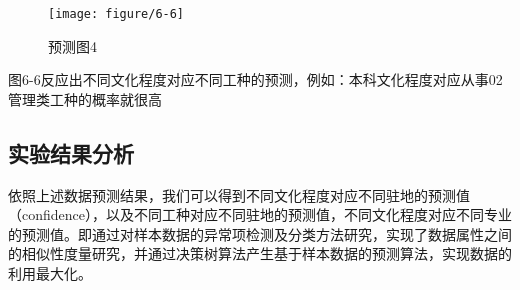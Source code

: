 \begin{figure}[thbp!]
	\centering
	\texttt{[image: figure/6-6]}
	\caption{预测图4}
	\label{fig:6-6}
\end{figure}

图6-6反应出不同文化程度对应不同工种的预测，例如：本科文化程度对应从事02 管理类工种的概率就很高

\subsection{实验结果分析}
依照上述数据预测结果，我们可以得到不同文化程度对应不同驻地的预测值（confidence），以及不同工种对应不同驻地的预测值，不同文化程度对应不同专业的预测值。即通过对样本数据的异常项检测及分类方法研究，实现了数据属性之间的相似性度量研究，并通过决策树算法产生基于样本数据的预测算法，实现数据的利用最大化。